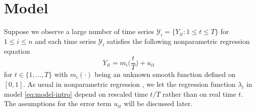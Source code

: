 \documentclass[a4paper,11pt]{article}
\numberwithin{equation}{section}
\begin{document}








\renewcommand{\baselinestretch}{1.5}\normalsize



\section{Model}

Suppose we observe a large number of time series $\mathcal{Y}_i = \{Y_{it}: 1 \leq t \leq T\}$ for $1 \leq i \leq n$ and each time series $\mathcal{Y}_i$ satisfies the following nonparametric regression equation
\begin{equation*}
Y_{it} = m_i\Big(\frac{t}{T}\Big) + u_{it}
\end{equation*}
for $t \in \{1, \ldots, T\}$ with $m_i(\cdot)$ being an unknown smooth function defined on $[0, 1]$. As usual in nonparametric regression \citep[see e.g.][]{Robinson1989}, we let the regression function $\lambda_i$ in model \eqref{eq:model-intro} depend on rescaled time $t/T$ rather than on real time $t$. The assumptions for the error term $u_{it}$ will be discussed later.
\end{document}
